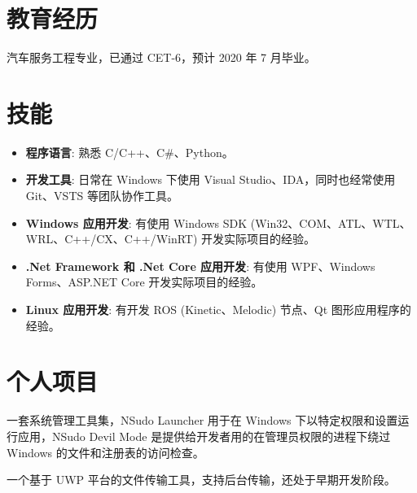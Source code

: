 \documentclass{resume}
\begin{document}
\renewcommand\headrulewidth{0pt}



\section{教育经历}

  汽车服务工程专业，已通过 CET-6，预计 2020 年 7 月毕业。

\section{技能}
\begin{itemize}

  \item \textbf{程序语言}:
    熟悉 C/C++、C\#、Python。

  \item \textbf{开发工具}:
    日常在 Windows 下使用 Visual Studio、IDA，同时也经常使用 Git、VSTS 等团队协作工具。

  \item \textbf{Windows 应用开发}:
    有使用 Windows SDK (Win32、COM、ATL、WTL、WRL、C++/CX、C++/WinRT) 开发实际项目的经验。

  \item \textbf{.Net Framework 和 .Net Core 应用开发}:
    有使用 WPF、Windows Forms、ASP.NET Core 开发实际项目的经验。
  
  \item \textbf{Linux 应用开发}:
    有开发 ROS (Kinetic、Melodic) 节点、Qt 图形应用程序的经验。

\end{itemize}

\section{个人项目}

一套系统管理工具集，NSudo Launcher 用于在 Windows 下以特定权限和设置运行应用，NSudo Devil Mode 是提供给开发者用的在管理员权限的进程下绕过 Windows 的文件和注册表的访问检查。

一个基于 UWP 平台的文件传输工具，支持后台传输，还处于早期开发阶段。
\end{document}
